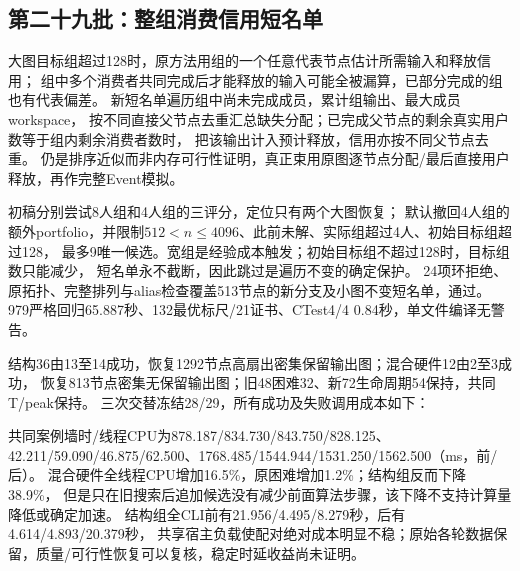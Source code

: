 \documentclass[UTF8,a4paper,11pt,fontset=fandol]{ctexart}
\begin{document}
\subsection{第二十九批：整组消费信用短名单}
大图目标组超过128时，原方法用组的一个任意代表节点估计所需输入和释放信用；
组中多个消费者共同完成后才能释放的输入可能全被漏算，已部分完成的组也有代表偏差。
新短名单遍历组中尚未完成成员，累计组输出、最大成员workspace，
按不同直接父节点去重汇总缺失分配；已完成父节点的剩余真实用户数等于组内剩余消费者数时，
把该输出计入预计释放，信用亦按不同父节点去重。
仍是排序近似而非内存可行性证明，真正束用原图逐节点分配/最后直接用户释放，再作完整Event模拟。

初稿分别尝试8人组和4人组的三评分，定位只有两个大图恢复；
默认撤回4人组的额外portfolio，并限制$512<n\le4096$、此前未解、实际组超过4人、初始目标组超过128，
最多9唯一候选。宽组是经验成本触发；初始目标组不超过128时，目标组数只能减少，
短名单永不截断，因此跳过是遍历不变的确定保护。
24项环拒绝、原拓扑、完整排列与alias检查覆盖513节点的新分支及小图不变短名单，通过。
979严格回归65.887秒、132最优标尺/21证书、CTest4/4 0.84秒，单文件编译无警告。

结构36由13至14成功，恢复1292节点高扇出密集保留输出图；混合硬件12由2至3成功，
恢复813节点密集无保留输出图；旧48困难32、新72生命周期54保持，共同T/peak保持。
三次交替冻结28/29，所有成功及失败调用成本如下：
\par\smallskip{}\par\smallskip

共同案例墙时/线程CPU为878.187/\allowbreak{}834.730/\allowbreak{}843.750/\allowbreak{}828.125、42.211/\allowbreak{}59.090/\allowbreak{}46.875/\allowbreak{}62.500、1768.485/\allowbreak{}1544.944/\allowbreak{}1531.250/\allowbreak{}1562.500（ms，前/后）。
混合硬件全线程CPU增加16.5\%，原困难增加1.2\%；结构组反而下降38.9\%，
但是只在旧搜索后追加候选没有减少前面算法步骤，该下降不支持计算量降低或确定加速。
结构组全CLI前有21.956/\allowbreak{}4.495/\allowbreak{}8.279秒，后有4.614/\allowbreak{}4.893/\allowbreak{}20.379秒，
共享宿主负载使配对绝对成本明显不稳；原始各轮数据保留，质量/可行性恢复可以复核，稳定时延收益尚未证明。
\end{document}
